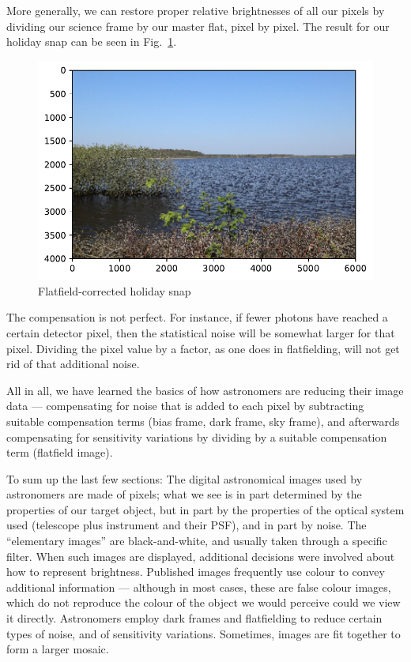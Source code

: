 \documentclass[twocolumn,apj]{openjournal}
\begin{document}
More generally, we can restore proper relative brightnesses of all our pixels by dividing our science frame by our master flat, pixel by pixel. The result for our holiday snap can be seen in Fig.~\ref{SampleVignetteCorr}.
\begin{figure}[htbp]
\begin{center}
\includegraphics[width=0.9\linewidth]{flatfield-landscape.pdf}
\caption{Flatfield-corrected holiday snap}
\label{SampleVignetteCorr}
\end{center}
\end{figure}
The compensation is not perfect. For instance, if fewer photons have reached a certain detector pixel, then the statistical noise will be somewhat larger for that pixel. Dividing the pixel value by a factor, as one does in flatfielding, will not get rid of that additional noise. 

All in all, we have learned the basics of how astronomers are reducing their image data --- compensating for noise that is added to each pixel by subtracting suitable compensation terms (bias frame, dark frame, sky frame), and afterwards compensating for sensitivity variations by dividing by a suitable compensation term (flatfield image).

To sum up the last few sections: The digital astronomical images used by astronomers are made of pixels; what we see is in part determined by the properties of our target object, but in part by the properties of the optical system used (telescope plus instrument and their PSF), and in part by noise. The ``elementary images'' are black-and-white, and usually taken through a specific filter. When such images are displayed, additional decisions were involved about how to represent brightness. Published images frequently use colour to convey additional information --- although in most cases, these are false colour images, which do not reproduce the colour of the object we would perceive could we view it directly. Astronomers employ dark frames and flatfielding to reduce certain types of noise, and of sensitivity variations. Sometimes, images are fit together to form a larger mosaic.
\end{document}
